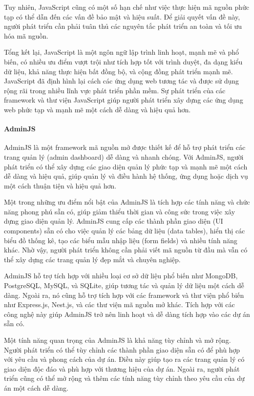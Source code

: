 Tuy nhiên, JavaScript cũng có một số hạn chế như việc thực hiện mã nguồn phức tạp có thể dẫn đến các vấn đề bảo mật và hiệu suất. Để giải quyết vấn đề này, người phát triển cần phải tuân thủ các nguyên tắc phát triển an toàn và tối ưu hóa mã nguồn.

Tổng kết lại, JavaScript là một ngôn ngữ lập trình linh hoạt, mạnh mẽ và phổ biến, có nhiều ưu điểm vượt trội như tích hợp tốt với trình duyệt, đa dạng kiểu dữ liệu, khả năng thực hiện bất đồng bộ, và cộng đồng phát triển mạnh mẽ. JavaScript đã định hình lại cách các ứng dụng web tương tác và được sử dụng rộng rãi trong nhiều lĩnh vực phát triển phần mềm. Sự phát triển của các framework và thư viện JavaScript giúp người phát triển xây dựng các ứng dụng web phức tạp và mạnh mẽ một cách dễ dàng và hiệu quả hơn.

\paragraph{AdminJS}
\mbox{}

AdminJS là một framework mã nguồn mở được thiết kế để hỗ trợ phát triển các trang quản lý (admin dashboard) dễ dàng và nhanh chóng. Với AdminJS, người phát triển có thể xây dựng các giao diện quản lý phức tạp và mạnh mẽ một cách dễ dàng và hiệu quả, giúp quản lý và điều hành hệ thống, ứng dụng hoặc dịch vụ một cách thuận tiện và hiệu quả hơn.

Một trong những ưu điểm nổi bật của AdminJS là tích hợp các tính năng và chức năng phong phú sẵn có, giúp giảm thiểu thời gian và công sức trong việc xây dựng giao diện quản lý. AdminJS cung cấp các thành phần giao diện (UI components) sẵn có cho việc quản lý các bảng dữ liệu (data tables), hiển thị các biểu đồ thống kê, tạo các biểu mẫu nhập liệu (form fields) và nhiều tính năng khác. Nhờ vậy, người phát triển không cần phải viết mã nguồn từ đầu mà vẫn có thể xây dựng các trang quản lý đẹp mắt và chuyên nghiệp.

AdminJS hỗ trợ tích hợp với nhiều loại cơ sở dữ liệu phổ biến như MongoDB, PostgreSQL, MySQL, và SQLite, giúp tương tác và quản lý dữ liệu một cách dễ dàng. Ngoài ra, nó cũng hỗ trợ tích hợp với các framework và thư viện phổ biến như Express.js, Nest.js, và các thư viện mã nguồn mở khác. Tích hợp với các công nghệ này giúp AdminJS trở nên linh hoạt và dễ dàng tích hợp vào các dự án sẵn có.

Một tính năng quan trọng của AdminJS là khả năng tùy chỉnh và mở rộng. Người phát triển có thể tùy chỉnh các thành phần giao diện sẵn có để phù hợp với yêu cầu và phong cách của dự án. Điều này giúp tạo ra các trang quản lý có giao diện độc đáo và phù hợp với thương hiệu của dự án. Ngoài ra, người phát triển cũng có thể mở rộng và thêm các tính năng tùy chỉnh theo yêu cầu của dự án một cách dễ dàng.

